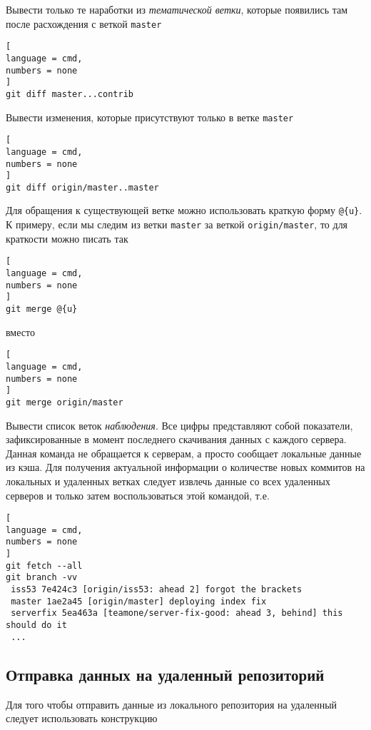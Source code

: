 \documentclass[%
	11pt,
	a4paper,
	utf8,
		]{article}
\begin{document}
Вывести только те наработки из \emph{тематической ветки}, которые появились там после расхождения с веткой \texttt{master}

\begin{lstlisting}[
language = cmd,
numbers = none
]
git diff master...contrib
\end{lstlisting}

Вывести изменения, которые присутствуют только в ветке \texttt{master}

\begin{lstlisting}[
language = cmd,
numbers = none
]
git diff origin/master..master
\end{lstlisting}

Для обращения к существующей ветке можно использовать краткую форму \texttt{@\{u\}}. К примеру, если мы следим из ветки \texttt{master} за веткой \texttt{origin/master}, то для краткости можно писать так

\begin{lstlisting}[
language = cmd,
numbers = none
]
git merge @{u}
\end{lstlisting}
вместо
\begin{lstlisting}[
language = cmd,
numbers = none
]
git merge origin/master
\end{lstlisting}

Вывести список веток \emph{наблюдения}. Все цифры представляют собой показатели, зафиксированные в момент последнего скачивания данных с каждого сервера. Данная команда не обращается к серверам, а просто сообщает локальные данные из кэша. Для получения актуальной информации о количестве новых коммитов на локальных и удаленных ветках следует извлечь данные со всех удаленных серверов и только затем воспользоваться этой командой, т.е.
\begin{lstlisting}[
language = cmd,
numbers = none
]
git fetch --all
git branch -vv
 iss53 7e424c3 [origin/iss53: ahead 2] forgot the brackets
 master 1ae2a45 [origin/master] deploying index fix
 serverfix 5ea463a [teamone/server-fix-good: ahead 3, behind] this should do it
 ...
\end{lstlisting} 


\subsection{Отправка данных на удаленный репозиторий}

Для того чтобы отправить данные из локального репозитория на удаленный следует использовать конструкцию
\end{document}
